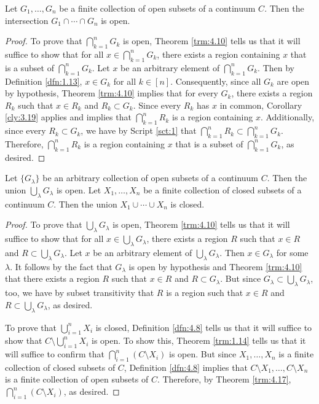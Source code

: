 \documentclass[../main.tex]{subfiles}
\begin{document}
\begin{theorem}\label{trm:4.17}
    Let $G_1,\dots,G_n$ be a finite collection of open subsets of a continuum $C$. Then the intersection $G_1\cap\cdots\cap G_n$ is open.
    \begin{proof}
        To prove that $\bigcap_{k=1}^nG_k$ is open, Theorem \ref{trm:4.10} tells us that it will suffice to show that for all $x\in\bigcap_{k=1}^nG_k$, there exists a region containing $x$ that is a subset of $\bigcap_{k=1}^nG_k$. Let $x$ be an arbitrary element of $\bigcap_{k=1}^nG_k$. Then by Definition \ref{dfn:1.13}, $x\in G_k$ for all $k\in[n]$. Consequently, since all $G_k$ are open by hypothesis, Theorem \ref{trm:4.10} implies that for every $G_k$, there exists a region $R_k$ such that $x\in R_k$ and $R_k\subset G_k$. Since every $R_k$ has $x$ in common, Corollary \ref{cly:3.19} applies and implies that $\bigcap_{k=1}^nR_k$ is a region containing $x$. Additionally, since every $R_k\subset G_k$, we have by Script \ref{sct:1} that $\bigcap_{k=1}^nR_k\subset\bigcap_{k=1}^nG_k$. Therefore, $\bigcap_{k=1}^nR_k$ is a region containing $x$ that is a subset of $\bigcap_{k=1}^nG_k$, as desired.
    \end{proof}
\end{theorem}

\begin{corollary}\label{cly:4.18}
    Let $\{G_\lambda\}$ be an arbitrary collection of open subsets of a continuum $C$. Then the union $\bigcup_\lambda G_\lambda$ is open. Let $X_1,\dots,X_n$ be a finite collection of closed subsets of a continuum $C$. Then the union $X_1\cup\cdots\cup X_n$ is closed.
    \begin{proof}
        To prove that $\bigcup_\lambda G_\lambda$ is open, Theorem \ref{trm:4.10} tells us that it will suffice to show that for all $x\in\bigcup_\lambda G_\lambda$, there exists a region $R$ such that $x\in R$ and $R\subset\bigcup_\lambda G_\lambda$. Let $x$ be an arbitrary element of $\bigcup_\lambda G_\lambda$. Then $x\in G_\lambda$ for some $\lambda$. It follows by the fact that $G_\lambda$ is open by hypothesis and Theorem \ref{trm:4.10} that there exists a region $R$ such that $x\in R$ and $R\subset G_\lambda$. But since $G_\lambda\subset\bigcup_\lambda G_\lambda$, too, we have by subset transitivity that $R$ is a region such that $x\in R$ and $R\subset\bigcup_\lambda G_\lambda$, as desired.\par
        To prove that $\bigcup_{i=1}^nX_i$ is closed, Definition \ref{dfn:4.8} tells us that it will suffice to show that $C\setminus\bigcup_{i=1}^nX_i$ is open. To show this, Theorem \ref{trm:1.14} tells us that it will suffice to confirm that $\bigcap_{i=1}^n\left( C\setminus X_i \right)$ is open. But since $X_1,\dots,X_n$ is a finite collection of closed subsets of $C$, Definition \ref{dfn:4.8} implies that $C\setminus X_1,\dots,C\setminus X_n$ is a finite collection of open subsets of $C$. Therefore, by Theorem \ref{trm:4.17}, $\bigcap_{i=1}^n\left( C\setminus X_i \right)$, as desired.
    \end{proof}
\end{corollary}
\end{document}
